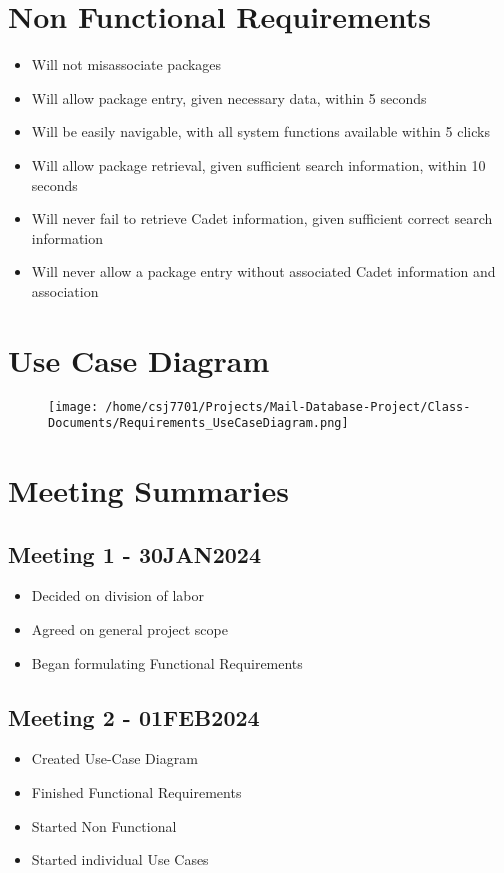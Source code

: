 \documentclass[11pt]{article}
\begin{document}
\section*{Non Functional Requirements}
\label{sec:org5186efd}
\begin{itemize}
\item Will not misassociate packages
\item Will allow package entry, given necessary data, within 5 seconds
\item Will be easily navigable, with all system functions available within 5 clicks
\item Will allow package retrieval, given sufficient search information, within 10 seconds
\item Will never fail to retrieve Cadet information, given sufficient correct search information
\item Will never allow a package entry without associated Cadet information and association
\end{itemize}
\section*{Use Case Diagram}
\label{sec:orgb6d163b}

\begin{figure}[htbp]
\centering
\texttt{[image: /home/csj7701/Projects/Mail-Database-Project/Class-Documents/Requirements\_UseCaseDiagram.png]}
\end{figure}
\newpage
\section*{Meeting Summaries}
\label{sec:org8d2f8e5}
\subsection*{Meeting 1 - 30JAN2024}
\label{sec:org91e49e1}
\begin{itemize}
\item Decided on division of labor
\item Agreed on general project scope
\item Began formulating Functional Requirements
\end{itemize}
\subsection*{Meeting 2 - 01FEB2024}
\label{sec:org1002cc3}
\begin{itemize}
\item Created Use-Case Diagram
\item Finished Functional Requirements
\item Started Non Functional
\item Started individual Use Cases
\end{itemize}
\end{document}
